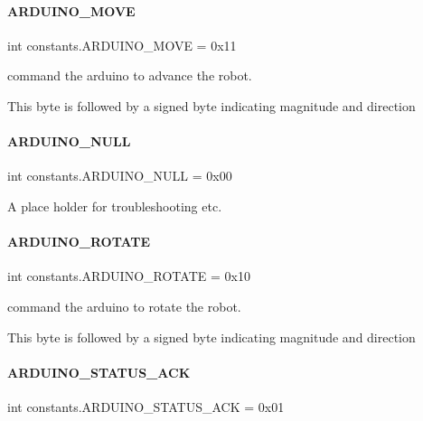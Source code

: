 \paragraph{\texorpdfstring{ARDUINO\_MOVE}{ARDUINO\_MOVE}}
{\footnotesize\ttfamily int constants.\+A\+R\+D\+U\+I\+N\+O\+\_\+\+M\+O\+VE = 0x11}



command the arduino to advance the robot. 

This byte is followed by a signed byte indicating magnitude and direction \mbox{\label{namespaceconstants_a4fc285d2a763b856a59abf7415a88f39}} 
\paragraph{\texorpdfstring{ARDUINO\_NULL}{ARDUINO\_NULL}}
{\footnotesize\ttfamily int constants.\+A\+R\+D\+U\+I\+N\+O\+\_\+\+N\+U\+LL = 0x00}



A place holder for troubleshooting etc. 

\mbox{\label{namespaceconstants_ae9932657445a57d6c7343fd8866ed04e}} 
\paragraph{\texorpdfstring{ARDUINO\_ROTATE}{ARDUINO\_ROTATE}}
{\footnotesize\ttfamily int constants.\+A\+R\+D\+U\+I\+N\+O\+\_\+\+R\+O\+T\+A\+TE = 0x10}



command the arduino to rotate the robot. 

This byte is followed by a signed byte indicating magnitude and direction \mbox{\label{namespaceconstants_a1457f970f66c031b379dac8ef6d7e131}} 
\paragraph{\texorpdfstring{ARDUINO\_STATUS\_ACK}{ARDUINO\_STATUS\_ACK}}
{\footnotesize\ttfamily int constants.\+A\+R\+D\+U\+I\+N\+O\+\_\+\+S\+T\+A\+T\+U\+S\+\_\+\+A\+CK = 0x01}



